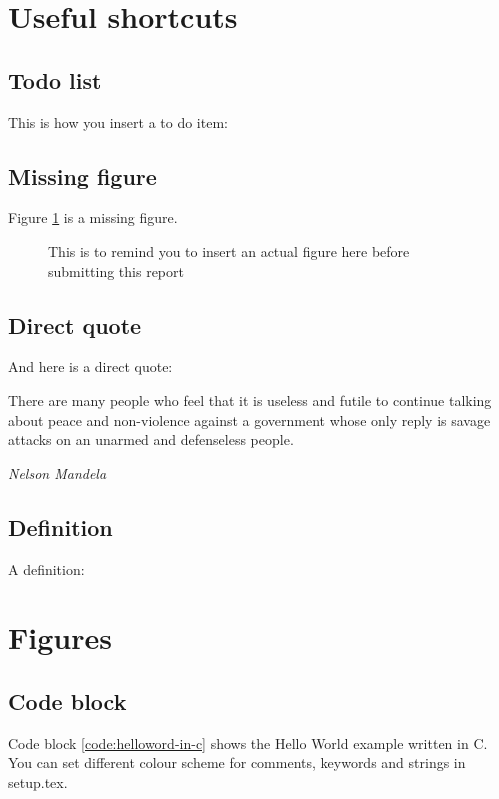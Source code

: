 \section{Useful shortcuts}
\subsection{Todo list}
This is how you insert a to do item:

\subsection{Missing figure}
Figure \ref{fig:missing-figure} is a missing figure.
\begin{figure}[!h]
  \caption[Missing figure 1]{This is to remind you to insert an actual figure here before submitting this report}
  \label{fig:missing-figure}  
\end{figure}

\subsection{Direct quote}
And here is a direct quote:
\begin{fancyquote}
  There are many people who feel that it is useless and futile to continue talking about peace and non-violence against a government whose only reply is savage attacks on an unarmed and defenseless people.
  
  \raggedleft\textit{Nelson Mandela}
\end{fancyquote}

\subsection{Definition}
A definition:


\section{Figures}
\subsection{Code block}
Code block \ref{code:helloword-in-c} shows the Hello World example written in C. You can set different colour scheme for comments, keywords and strings in setup.tex.

